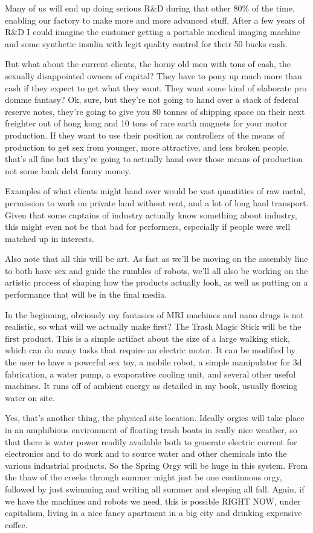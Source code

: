 Many of us will end up doing serious R\&D during that other 80\% of the
time, enabling our factory to make more and more advanced stuff. After a
few years of R\&D I could imagine the customer getting a portable
medical imaging machine and some synthetic insulin with legit quality
control for their 50 bucks cash.

But what about the current clients, the horny old men with tons of cash,
the sexually disappointed owners of capital? They have to pony up much
more than cash if they expect to get what they want. They want some kind
of elaborate pro domme fantasy? Ok, sure, but they're not going to hand
over a stack of federal reserve notes, they're going to give you 80
tonnes of shipping space on their next freighter out of hong kong and 10
tons of rare earth magnets for your motor production. If they want to
use their position as controllers of the means of production to get sex
from younger, more attractive, and less broken people, that's all fine
but they're going to actually hand over those means of production not
some bank debt funny money.

Examples of what clients might hand over would be vast quantities of raw
metal, permission to work on private land without rent, and a lot of
long haul transport. Given that some captains of industry actually know
something about industry, this might even not be that bad for
performers, especially if people were well matched up in interests.

Also note that all this will be art. As fast as we'll be moving on the
assembly line to both have sex and guide the rumbles of robots, we'll
all also be working on the artistic process of shaping how the products
actually look, as well as putting on a performance that will be in the
final media.

In the beginning, obviously my fantasies of MRI machines and nano drugs
is not realistic, so what will we actually make first? The Trash Magic
Stick will be the first product. This is a simple artifact about the
size of a large walking stick, which can do many tasks that require an
electric motor. It can be modified by the user to have a powerful sex
toy, a mobile robot, a simple manipulator for 3d fabrication, a water
pump, a evaporative cooling unit, and several other useful machines. It
runs off of ambient energy as detailed in my book, usually flowing water
on site.

Yes, that's another thing, the physical site location. Ideally orgies
will take place in an amphibious environment of floating trash boats in
really nice weather, so that there is water power readily available both
to generate electric current for electronics and to do work and to
source water and other chemicals into the various industrial products.
So the Spring Orgy will be huge in this system. From the thaw of the
creeks through summer might just be one continuous orgy, followed by
just swimming and writing all summer and sleeping all fall. Again, if we
have the machines and robots we need, this is possible RIGHT NOW, under
capitalism, living in a nice fancy apartment in a big city and drinking
expensive coffee.


